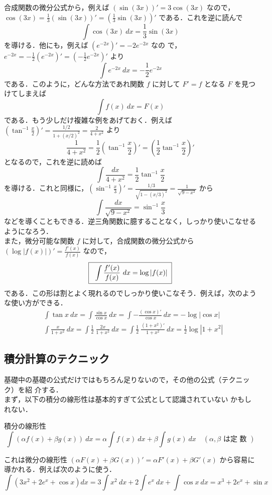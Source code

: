 \documentclass[10pt, uplatex, dvipdfmx]{jsarticle}
\theoremstyle{definition}
\numberwithin{equation}{section}
\newcommand{\ds}{\displaystyle}
\begin{document}
合成関数の微分公式から，例えば $\left( \sin\left(3x\right)\right)' = 3
\cos(3x)$
なので，$\ds \cos(3x) = \frac{1}{3}\left( \sin (3x)\right)' = \left(
  \frac{1}{3} \sin(3x) \right)'$ である．これを逆に読んで
\[
 \int\cos (3x) \ dx = \frac{1}{3} \sin (3x)
\]
を導ける．他にも，例えば $\left( e^{-2x}\right)' = -2 e^{-2x}$ なの
で，$\ds e^{-2x} = -\frac{1}{2} \left( e^{-2x}\right)' = \left(
-\frac{1}{2} e^{-2x}\right)'$ より
\[
  \int e^{-2x} \ dx = -\frac{1}{2} e^{-2x}
\]
である．このように，どんな方法であれ関数 $f$ に対して $F' = f$ となる $F$ を見つけてしまえば
\[
  \int f(x) \ dx = F(x)
\]
である．もう少しだけ複雑な例をあげておく．例えば
$\ds \left( \tan^{-1} \frac{x}{2}\right)' = \frac{1/2}{1 + \left(x/2\right)^2} = \frac{2}{4+x^2}$ より
\[
  \frac{1}{4+x^2} = \frac{1}{2} \left( \tan^{-1}\frac{x}{2}\right)' = \left( \frac{1}{2}\tan^{-1}\frac{x}{2}\right)'
\]
となるので，これを逆に読めば
\[
  \int \frac{dx}{4+x^2} = \frac{1}{2} \tan^{-1}\frac{x}{2}
\]
を導ける．これと同様に，$\ds \left(\sin^{-1} \frac{x}{3} \right)' =
\frac{1/3}{\sqrt{1-(x/3)^2}}=\frac{1}{\sqrt{9-x^2}}$ から
\[
  \int \frac{dx}{\sqrt{9-x^2}} = \sin^{-1} \frac{x}{3}
\]
などを導くこともできる．逆三角関数に臆することなく，しっかり使いこなせるようになろう．\\

また，微分可能な関数 $f$ に対して，合成関数の微分公式から
$\ds \left(\log | f(x) |\right)' = \frac{f'(x)}{f(x)}$ なので，
\[
  \fbox{\; $\ds \int \frac{f'(x)}{f(x)} \ dx = \log | f(x) |$\;}
\]
である．この形は割とよく現れるのでしっかり使いこなそう．例えば，次のような使い方ができる．
\[
  \begin{aligned}
    &\int \tan x \ dx = \int \frac{\sin x }{\cos x} \ dx = \int  - \frac{\left( \cos x\right)'}{\cos x} \ dx
      = - \log|\cos x| \\[2ex]
    &\int \frac{x}{1+x^2} \ dx = \int \frac{1}{2}~ \frac{2x}{1+x^2} \ dx
      = \int \frac{1}{2}~\frac{(1+x^2)'}{1+x^2} \ dx
      = \frac{1}{2} \log|1+x^2|
  \end{aligned}
\]


\newpage

\subsection{積分計算のテクニック}

基礎中の基礎の公式だけではもちろん足りないので，その他の公式（テクニック）を紹
介する．\\

まず，以下の積分の線形性は基本的すぎて公式として認識されていない
かもしれない．
\begin{itembox}[l]{積分の線形性}
  \[
    \int \left( \alpha f(x) + \beta g(x) \right) \ dx = \alpha \int
    f(x) \ dx + \beta \int g(x) \ dx \quad (\alpha, \beta \text{ は定
      数 } )
  \]
\end{itembox}
これは微分の線形性
$\left( \alpha F(x) + \beta G(x) \right)' = \alpha F'(x) + \beta
G'(x)$ から容易に導かれる．例えば次のように使う．
\[
  \int \left( 3x^2 + 2e^x + \cos x \right) dx
  = 3 \int x^2 \ dx + 2 \int e^x \ dx + \int \cos x \ dx 
  = x^3  + 2 e^x + \sin x 
\]\\
\end{document}
